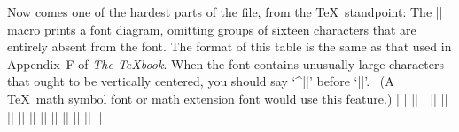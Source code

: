 Now comes one of the hardest parts of the file, from the \TeX\
standpoint: The |\table| macro prints a font diagram, omitting
groups of sixteen characters that are entirely absent from the font.
The format of this table is the same as that used in Appendix~F
of {\sl The \TeX book}. When the font contains unusually large characters
that ought to be vertically centered, you should say `^|\centerlargechars|'
before `|\table|'. \ (A \TeX\ math symbol font or math extension font
would use this feature.)
\beginlines
|\def\oct#1{\hbox{\rm\'{}\kern-.2em\it#1\/\kern.05em}} %
|\def\hex#1{\hbox{\rm\H{}\tt#1}} %
|\def\setdigs#1"#2{\gdef\h{#2}%
| \m=\n \divide\m by 64 \xdef\0{\the\m}%
| \multiply\m by-64 \advance\m by\n \divide\m by 8 \xdef\1{\the\m}}|
|\def\testrow{\setbox0=\hbox{\penalty 1\def\\{\char"\h}%
| \\0\\1\\2\\3\\4\\5\\6\\7\\8\\9\\A\\B\\C\\D\\E\\F%
| \global\p=\lastpenalty}} %
|\def\oddline{\cr|
|  \noalign{\nointerlineskip}|
|  \multispan{19}\hrulefill&|
|  \setbox0=\hbox{\lower 2.3pt\hbox{\hex{\h x}}}\smash{\box0}\cr|
|  \noalign{\nointerlineskip}}|
|\newif\ifskipping|
|\def\evenline{\loop\skippingfalse|
| \ifnum\n<256 \m=\n \divide\m 16 \chardef\next=\m|
| \expandafter\setdigs\meaning\next \testrow|
| \ifnum\p=1 \skippingtrue \fi\fi|
| \ifskipping \global\advance\n 16 \repeat|
| \ifnum\n=256 \let\next=\endchart\else\let\next=\morechart\fi|
| \next}|
|\def\morechart{\cr\noalign{\hrule\penalty5000}|
| \chartline \oddline \m=\1 \advance\m 1 \xdef\1{\the\m}|
| \chartline \evenline}|
|\def\chartline{&\oct{\0\1x}&&\:&&\:&&\:&&\:&&\:&&\:&&\:&&\:&&}|
|\def\chartstrut{\lower4.5pt\vbox to14pt{}}|
|\def\table{$$\global\n=0|
|  \halign to\hsize\bgroup|
|    \chartstrut##\tabskip0pt plus10pt&|
|    &\hfil##\hfil&\vrule##\cr|
|    \lower6.5pt\null|
|    &&&\oct0&&\oct1&&\oct2&&\oct3&&\oct4&&\oct5&&\oct6&&\oct7&\evenline}|
|\def\endchart{\cr\noalign{\hrule}|
|  \raise11.5pt\null&&&\hex 8&&\hex 9&&\hex A&&\hex B&|
|  &\hex C&&\hex D&&\hex E&&\hex F&\cr\egroup$$\par}|
|\def\:{\setbox0=\hbox{\noboundary\char\n\noboundary}%
|  \ifdim\ht0>7.5pt\reposition|
|  \else\ifdim\dp0>2.5pt\reposition\fi\fi|
|  \box0\global\advance\n 1 }|
|\def\reposition{\setbox0=\vbox{\kern2pt\box0}\dim=\dp0|
|  \advance\dim 2pt \dp0=\dim}|
|\def\centerlargechars{|
|  \def\reposition{\setbox0=\hbox{$\vcenter{\kern2pt\box0\kern2pt}$}}}|
\endlines

